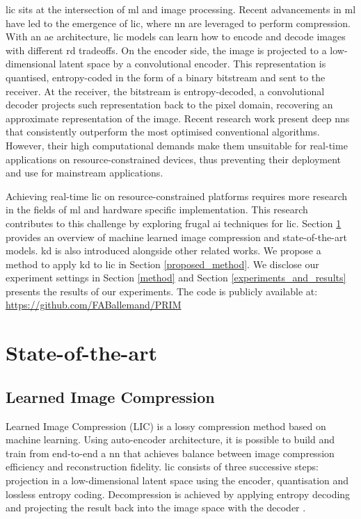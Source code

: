 \documentclass{article}
\begin{document}
\acrfull{lic} sits at the intersection of \acrfull{ml} and image processing. Recent advancements in \acrshort{ml} have led to the emergence of \acrshort{lic}, where \acrfull{nn} are leveraged to perform compression. With an \acrfull{ae} architecture, \acrshort{lic} models can learn how to encode and decode images with different \acrfull{rd} tradeoffs. On the encoder side, the image is projected to a low-dimensional latent space by a convolutional encoder. This representation is quantised, entropy-coded in the form of a binary bitstream and sent to the receiver. At the receiver, the bitstream is entropy-decoded, a convolutional decoder projects such representation back to the pixel domain, recovering an approximate representation of the image. Recent research work present deep \acrshort{nn}s that consistently outperform the most optimised conventional algorithms. However, their high computational demands make them unsuitable for real-time applications on resource-constrained devices, thus preventing their deployment and use for mainstream applications.

Achieving real-time \acrshort{lic} on resource-constrained platforms requires more research in the fields of \acrshort{ml} and hardware specific implementation. This research contributes to this challenge by exploring frugal \acrfull{ai} techniques for \acrshort{lic}. Section \ref{sota} provides an overview of machine learned image compression and state-of-the-art models. \acrfull{kd} is also introduced alongside other related works. We propose a method to apply \acrshort{kd} to \acrshort{lic} in Section \ref{proposed_method}. We disclose our experiment settings in Section \ref{method} and Section \ref{experiments_and_results} presents the results of our experiments. The code is publicly available at: \url{https://github.com/FABallemand/PRIM}

\section{State-of-the-art}
\label{sota}

\subsection{Learned Image Compression}
Learned Image Compression (LIC) is a lossy compression method based on machine learning. Using auto-encoder architecture, it is possible to build and train from end-to-end a \acrshort{nn} that achieves balance between image compression efficiency and reconstruction fidelity. \acrshort{lic} consists of three successive steps: projection in a low-dimensional latent space using the encoder, quantisation and lossless entropy coding. Decompression is achieved by applying entropy decoding and projecting the result back into the image space with the decoder \cite{licmedium, licstanford}.
\end{document}
